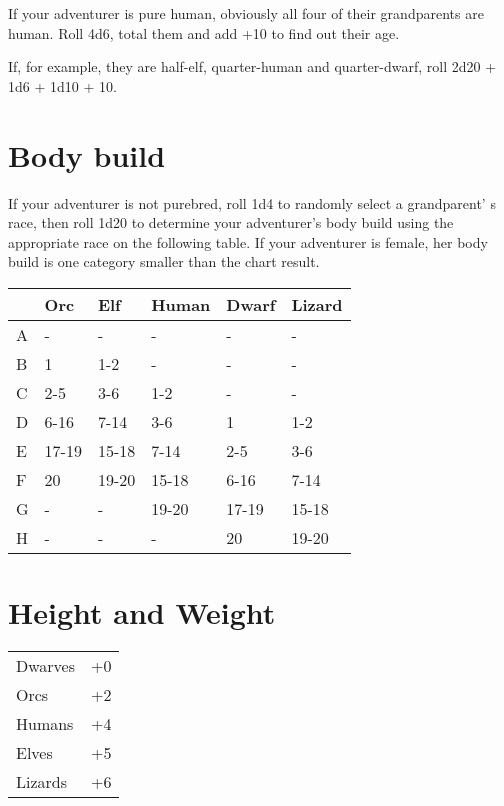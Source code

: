 If your adventurer is pure human, obviously all four of their grandparents are human. Roll 4d6, total them and add +10 to find out their age.

If, for example, they are half-elf, quarter-human and quarter-dwarf, roll 2d20 + 1d6 + 1d10 + 10.

\section{Body build}

If your adventurer is not purebred, roll 1d4 to randomly select a grandparent' s race, then roll 1d20 to determine your adventurer's body build using the appropriate race on the following table. If your adventurer is female, her body build is one category smaller than the chart result.
\begin{normboxc}
\small
\begin{tabular}{@{} l l l l l l }
 & \textbf{Orc} & \textbf{Elf} & \textbf{Human} & \textbf{Dwarf} & \textbf{Lizard}\\
\midrule
A & - & - & - & - & -\\
B & 1 & 1-2 & - & - & -\\
C & 2-5 & 3-6 & 1-2 & - & -\\
D & 6-16 & 7-14 & 3-6 & 1 & 1-2\\
E & 17-19 & 15-18 & 7-14 & 2-5 & 3-6\\
F & 20 & 19-20 & 15-18 & 6-16 & 7-14\\
G & - & - & 19-20 & 17-19 & 15-18\\
H & - & - & - & 20 & 19-20
\end{tabular}
\end{normboxc}

\section{Height and Weight}

\begin{normbox}
\small

\begin{tabular}{@{}l l}
Dwarves & +0\\
Orcs & +2\\
Humans & +4\\
Elves & +5\\
Lizards & +6\\
\end{tabular}
\end{normbox}

